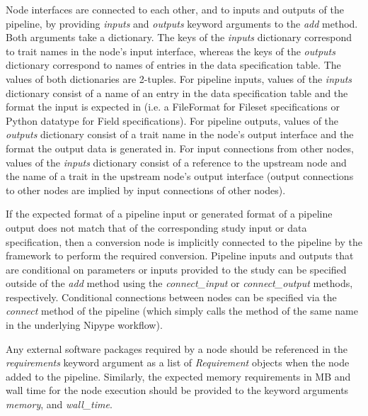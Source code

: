 \documentclass[smallextended]{svjour3}       %
\begin{document}
Node interfaces are connected to each other, and to inputs and outputs of the pipeline, by
providing \emph{inputs} and \emph{outputs} keyword arguments to the \emph{add} method. Both
arguments take a dictionary. The keys of the \emph{inputs} dictionary correspond to
trait names in the node's input interface, whereas the keys of the \emph{outputs} dictionary correspond to
names of entries in the data specification table. The values of both dictionaries are 2-tuples. For pipeline
inputs, values of the \emph{inputs} dictionary consist of a name of an entry in the data specification table
and the format the input is expected in (i.e. a FileFormat for Fileset specifications or Python datatype for Field specifications).
For pipeline outputs, values of the \emph{outputs} dictionary consist of a trait name in the node's output interface and the format the
output data is generated in. For input connections from other nodes, values of the \emph{inputs} dictionary
consist of a reference to the upstream node and the name of a trait in the
upstream node's output interface (output connections to other nodes are implied by input connections of other nodes).

If the expected format of a pipeline input or generated format of a pipeline output does not match that
of the corresponding study input or data specification, then a conversion node is implicitly connected
to the pipeline by the framework to perform the required conversion. Pipeline inputs and outputs
that are conditional on parameters or inputs provided to the study can be specified outside of the
\emph{add} method using the \emph{connect\_input} or
\emph{connect\_output} methods, respectively. Conditional connections between
nodes can be specified via the \emph{connect} method of the pipeline (which simply calls the
method of the same name in the underlying Nipype workflow).

Any external software packages required by a node should be referenced
in the \emph{requirements} keyword argument as a list of
\emph{Requirement} objects when the node added to the pipeline.
Similarly, the expected memory requirements in MB and
wall time for the node execution should be provided to the keyword arguments
\emph{memory}, and \emph{wall\_time}.
\end{document}
